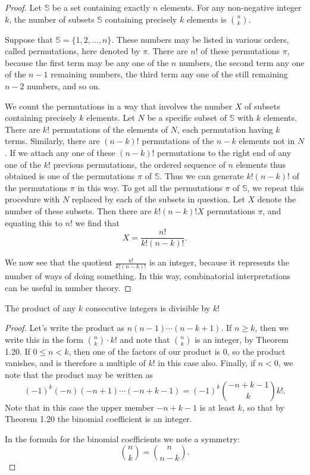\documentclass[11pt]{article}
\begin{document}
\begin{proof}
    Let \(\mathbb{S}\) be a set containing exactly \(n\) elements. For any non-negative integer \(k\), the number of subsets \(\mathbb{S}\) containing precisely \(k\) elements is \(\binom{n}{k}\).

    Suppose that \(\mathbb{S} = \{1, 2, \ldots, n\}\). These numbers may be listed
    in various orders, called permutations, here denoted by \(\pi\). There are
    \(n!\) of these permutations \(\pi\), because the first term may be any one of
    the \(n\) numbers, the second term any one of the \(n - 1\) remaining numbers,
    the third term any one of the still remaining \(n - 2\) numbers, and so on.

    We count the permutations in a way that involves the number \(X\) of subsets
    containing precisely \(k\) elements. Let \(N\) be a specific subset of
    \(\mathbb{S}\) with \(k\) elements. There are \(k!\) permutations of the
    elements of \(N\), each permutation having \(k\) terms. Similarly, there are
    \((n - k)!\) permutations of the \(n - k\) elements not in \(N\). If we attach
    any one of these \((n - k)!\) permutations to the right end of any one of the
    \(k!\) previous permutations, the ordered sequence of \(n\) elements thus
    obtained is one of the permutations \(\pi\) of \(\mathbb{S}\). Thus we can
    generate \(k!(n - k)!\) of the permutations \(\pi\) in this way. To get all the
    permutations \(\pi\) of \(\mathbb{S}\), we repeat this procedure with \(N\)
    replaced by each of the subsets in question. Let \(X\) denote the number of
    these subsets. Then there are \(k!(n - k)!X\) permutations \(\pi\), and
    equating this to \(n!\) we find that
    \[
        X = \frac{n!}{k!(n - k)!}.
    \]

    We now see that the quotient \(\frac{n!}{k! (n - k)!}\) is an integer, because
    it represents the number of ways of doing something. In this way, combinatorial
    interpretations can be useful in number theory.
\end{proof}
\begin{theorem}
    The product of any \(k\) consecutive integers is divisible by \(k!\)
\end{theorem}
\begin{proof}
    Let's write the product as \(n(n - 1) \cdots (n - k + 1)\). If \(n \geq k\), then we write this in the form \(\binom{n}{k} \cdot k!\) and note that \(\binom{n}{k}\) is an integer, by Theorem 1.20. If \(0 \leq n < k\), then one of the factors of our product is 0, so the product vanishes, and is therefore a multiple of \(k!\) in this case also. Finally, if \(n < 0\), we note that the product may be written as
    \[
        (-1)^k (-n)(-n + 1) \cdots (-n + k - 1) = (-1)^k \binom{-n + k - 1}{k} k!.
    \]
    Note that in this case the upper member \(-n + k - 1\) is at least \(k\), so
    that by Theorem 1.20 the binomial coefficient is an integer.

    In the formula for the binomial coefficients we note a symmetry:
    \[
        \binom{n}{k} = \binom{n}{n - k}.
    \]
\end{proof}
\end{document}
